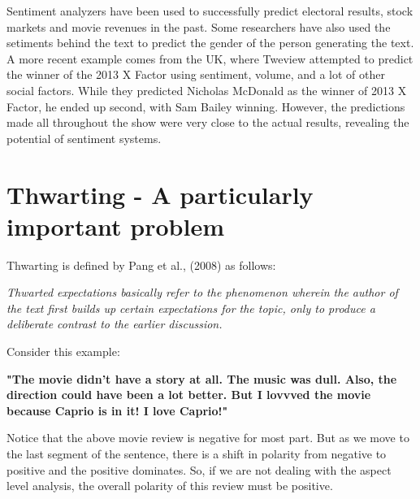 \begin{enumerate}[(a)]
\vspace{8mm}

Sentiment analyzers have been used to successfully predict electoral results, stock markets and movie revenues in the past. Some researchers have also used the setiments behind
the text to predict the gender of the person generating the text. A more recent example comes from the UK, 
where Tweview attempted to predict the winner of the 2013 X Factor using sentiment, volume, and a lot of other social factors.
While they predicted Nicholas McDonald as the winner of 2013 X Factor, he ended up second, with Sam Bailey winning. 
However, the predictions made all throughout the show were very close to the actual results, revealing the potential of sentiment systems.

\end{enumerate} 

\section{Thwarting - A particularly important problem}

Thwarting is defined by Pang et al., (2008) as follows:

\vspace{8mm}

\textit{Thwarted expectations basically refer to the
phenomenon wherein the author of the text first
builds up certain expectations for the topic, only
to produce a deliberate contrast to the earlier
discussion.}

\vspace{8mm}

Consider this example:

\vspace{8mm}

\textbf{"The movie didn't have a story at all. The music was dull. Also, the direction could have been a lot better. But I lovvved the movie because Caprio is in it! I love Caprio!"}

\vspace{8mm}

Notice that the above movie review is negative for most part. But as we move to the last segment of the sentence, there is a shift in polarity from negative to positive
and the positive dominates. So, if we are not dealing with the aspect level analysis, the overall polarity of this review must be positive.

\vspace{8mm}

